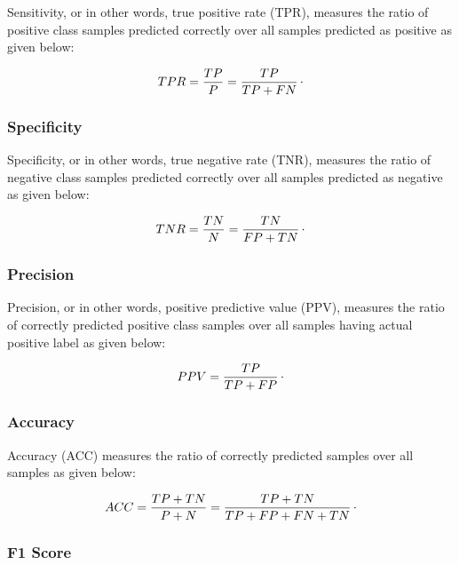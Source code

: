 Sensitivity, or in other words, true positive rate (TPR), measures the ratio of positive class samples predicted correctly over all samples predicted as positive as given below:

\begin{equation}
	\label{eq:TPR}
	TPR = \frac{TP}{P} = \frac{TP}{TP + FN}\raisepunct{.}
\end{equation}

\subsubsection*{Specificity}

Specificity, or in other words, true negative rate (TNR),  measures the ratio of negative class samples predicted correctly over all samples predicted as negative as given below:

\begin{equation}
	\label{eq:TNR}
	TNR = \frac{TN}{N} = \frac{TN}{FP + TN}\raisepunct{.}
\end{equation}

\subsubsection*{Precision}

Precision, or in other words, positive predictive value (PPV), measures the ratio of correctly predicted positive class samples over all samples having actual positive label as given below:

\begin{equation}
	\label{eq:PPV}
	PPV = \frac{TP}{TP + FP}\raisepunct{.}
\end{equation}

\subsubsection*{Accuracy}

Accuracy (ACC) measures the ratio of correctly predicted samples over all samples as given below:

\begin{equation}
	\label{eq:ACC}
	ACC = \frac{TP + TN}{P + N} = \frac{TP + TN}{TP + FP + FN + TN}\raisepunct{.}
\end{equation}

\subsubsection*{F1 Score}

